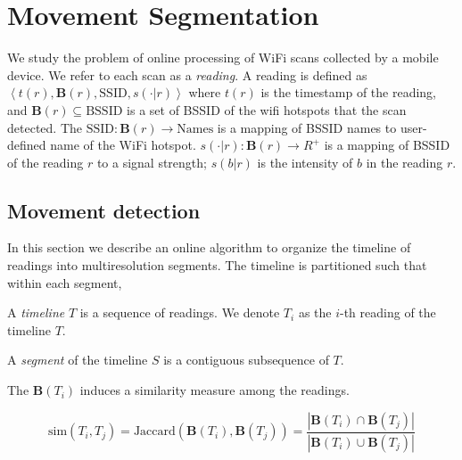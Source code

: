 \newcommand{\bssid}{\mathbf{B}}
\newcommand{\ssid}{\mathrm{SSID}}
\newcommand{\ssim}{\mathrm{sim}}
\renewcommand{\SS}{\mathbf{S}}
\newcommand{\RR}{\mathbf{R}}
\newcommand{\FF}{\mathbf{F}}
\newcommand{\LL}{\mathbf{L}}
\newcommand{\lleft}{\mathrm{left}}
\newcommand{\rright}{\mathrm{right}}
\newcommand{\RRR}{\hspace{0.4cm}}

\section{Movement Segmentation}

\label{sec:movement}

We study the problem of online processing of WiFi scans collected by a mobile
device.  We refer to each scan as a {\em reading}.
A reading is defined as $\left<t(r), \bssid(r), \ssid, s(\cdot|r)\right>$ where $t(r)$ is
the timestamp of the reading, and $\bssid(r)\subseteq\mathrm{BSSID}$ is a set of
BSSID of the wifi hotspots that the scan detected. 
The $\ssid:\bssid(r)\to\mathrm{Names}$ is a mapping of BSSID names to
user-defined name of the WiFi hotspot.  $s(\cdot|r):\bssid(r)\to R^+$ is a
mapping of BSSID of the reading $r$ to a signal strength; $s(b|r)$ is the
intensity of $b$ in the reading $r$.

\subsection{Movement detection}

In this section we describe an online algorithm to organize the timeline of
readings into multiresolution segments.  The timeline is partitioned such that
within each segment, 

\begin{definition}
    A {\em timeline} $T$ is a sequence of readings.  
    We denote $T_i$ as the $i$-th reading of the timeline $T$.

    A {\em segment} of the timeline $S$ is a contiguous subsequence of $T$.
\end{definition}

The $\bssid(T_i)$ induces a similarity measure among the readings.

\begin{definition}
$$\ssim(T_i, T_j) = \mathrm{Jaccard}(\bssid(T_i), \bssid(T_j))
= \frac{|\bssid(T_i) \cap \bssid(T_j)|}{|\bssid(T_i) \cup \bssid(T_j)|}
$$
\end{definition}

